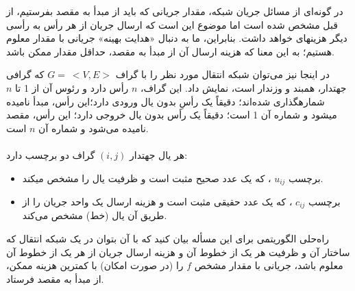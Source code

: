 \documentclass[]{article}
\begin{document}
در گونه‌ای از مسائل جریان شبکه، مقدار جریانی که باید از مبدأ به مقصد بفرستیم، از قبل مشخص شده است
اما موضوع این است که ارسال جریان از هر رأس به رأسی دیگر هزینهای خواهد داشت. 
بنابراین، ما به دنبال «هدایت بهینه» جریانی با مقدار معلوم هستیم؛
به این معنا که هزینه ارسال آن از مبدأ به مقصد، حداقل مقدار ممکن باشد.

در اینجا نیز می‌توان شبکه انتقال مورد نظر را با گراف $G = \: <V,E>$ که گرافی جهتدار، همبند و وزندار است، نمایش داد.
این گراف، $n$ رأس دارد و رئوس آن از 1 تا $n$ شمارهگذاری شده‌اند؛
دقیقاً یک رأسِ بدون یال ورودی دارد؛این رأس، مبدأ نامیده میشود و شماره آن 1 است؛
دقیقاً یک رأس بدون یال خروجی دارد؛ این رأس، مقصد نامیده می‌شود و شماره آن $n$ است.
\\ \\
هر یال جهتدار $(i, j)$ گراف دو برچسب دارد:
\begin{itemize}
    \item برچسب $u_{ij}$ ، که یک عدد صحیح مثبت است و ظرفیت یال را مشخص میکند.
    \item برچسب $c_{ij}$ ، که یک عدد حقیقی مثبت است و هزینه ارسال یک واحد جریان را از طریق آن یال (خط) مشخص می‌کند.
\end{itemize}

راه‌حلی الگوریتمی برای این مسأله بیان کنید که با آن بتوان در یک شبکه انتقال که ساختار آن و ظرفیت هر یک از خطوط آن و هزینه ارسال جریان از هر یک از خطوط آن معلوم باشد،
جریانی با مقدار مشخص $f$ را (در صورت امکان) با کمترین هزینه ممکن، از مبدأ به مقصد فرستاد. 
\end{document}
